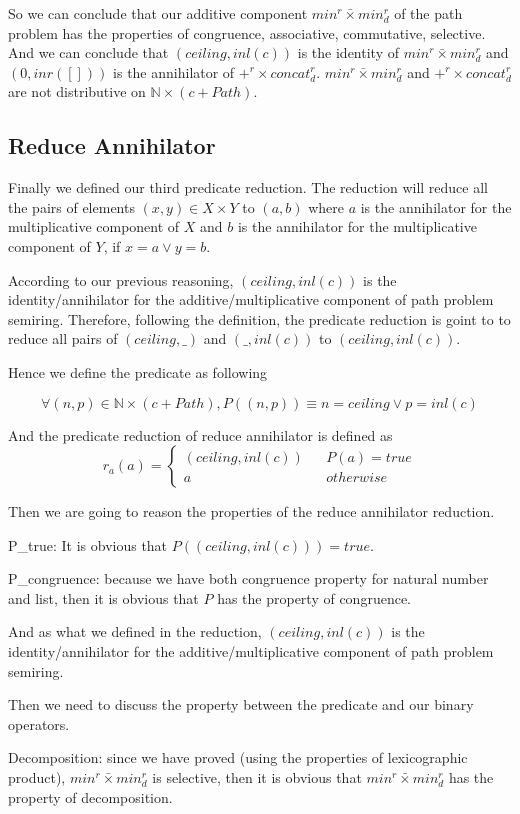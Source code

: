 \documentclass[a4paper,12pt,twoside,openright]{report}
\newcommand{\e}[2]{
\begin{equation}
  \label{#1} 
  #2
\end{equation}
}
\begin{document}
So we can conclude that our additive component $min^r \bar{\times} min^r_d$  of the path problem has the properties of congruence, associative, commutative, selective. And we can conclude that  $(ceiling,inl(c))$  is the identity of $min^r \bar{\times} min^r_d$ and $(0,inr([]))$ is the annihilator of $+^r \times concat^r_d$. $min^r \bar{\times} min^r_d$ and $+^r \times concat^r_d$ are not distributive on $\mathbb{N} \times (c + Path)$.
\subsection{Reduce Annihilator}
Finally we defined our third predicate reduction. The reduction will reduce all the pairs of elements $(x,y) \in X \times Y$ to $(a,b)$ where $a$ is the annihilator for the multiplicative component of $X$ and $b$ is the annihilator for the multiplicative component of $Y$, if $x = a \vee y = b$.

According to our previous reasoning, $(ceiling,inl (c))$ is the identity/annihilator for the additive/multiplicative component of path problem semiring. Therefore, following the definition, the predicate reduction is goint to to reduce all pairs of $(ceiling,\_)$ and $(\_,inl(c))$ to $(ceiling,inl(c))$.

Hence we define the predicate as following 
\e{pr:def:reduce_annihilator_p}{\forall (n,p) \in \mathbb{N} \times (c + Path), P((n,p)) \equiv n = ceiling \vee p = inl(c)}
And the predicate reduction of reduce annihilator is defined as \e{pr:def:reduce_annihilator_r}{r_a(a) = \left\{
\begin{aligned}
(ceiling,inl (c)) &  & P(a) = true \\
a &  & otherwise 
\end{aligned}
\right.}

Then we are going to reason the properties of the reduce annihilator reduction.

P\_true: It is obvious that $P((ceiling,inl (c))) = true$.

P\_congruence: because we have both congruence property for natural number and list, then it is obvious that $P$ has the property of congruence.

And as what we defined in the reduction, $(ceiling,inl (c))$ is the identity/annihilator for the additive/multiplicative component of path problem semiring.

Then we need to discuss the property between the predicate and our binary operators.

Decomposition: since we have proved (using the properties of lexicographic product), $min^r \bar{\times} min^r_d$ is selective, then it is obvious that $min^r \bar{\times} min^r_d$ has the property of decomposition.
\end{document}

